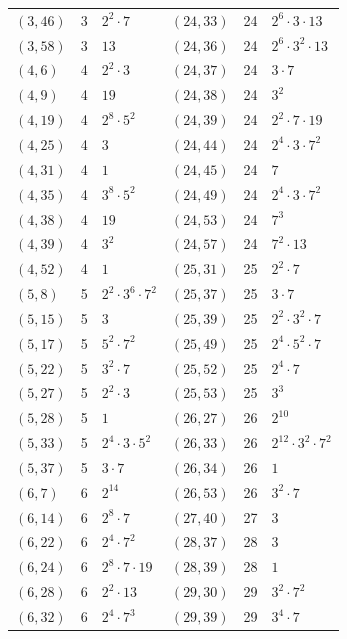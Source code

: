 \documentclass[11pt]{article}
\begin{document}
\begin{longtable}{@{}lrl@{\qquad}lrl@{}}
$(3,46)$ & 3 & $2^{2}\cdot 7$ & $(24,33)$ & 24 & $2^{6}\cdot 3\cdot 13$\\
$(3,58)$ & 3 & $13$ & $(24,36)$ & 24 & $2^{6}\cdot 3^{2}\cdot 13$\\
$(4,6)$ & 4 & $2^{2}\cdot 3$ & $(24,37)$ & 24 & $3\cdot 7$\\
$(4,9)$ & 4 & $19$ & $(24,38)$ & 24 & $3^{2}$\\
$(4,19)$ & 4 & $2^{8}\cdot 5^{2}$ & $(24,39)$ & 24 & $2^{2}\cdot 7\cdot 19$\\
$(4,25)$ & 4 & $3$ & $(24,44)$ & 24 & $2^{4}\cdot 3\cdot 7^{2}$\\
$(4,31)$ & 4 & $1$ & $(24,45)$ & 24 & $7$\\
$(4,35)$ & 4 & $3^{8}\cdot 5^{2}$ & $(24,49)$ & 24 & $2^{4}\cdot 3\cdot 7^{2}$\\
$(4,38)$ & 4 & $19$ & $(24,53)$ & 24 & $7^{3}$\\
$(4,39)$ & 4 & $3^{2}$ & $(24,57)$ & 24 & $7^{2}\cdot 13$\\
$(4,52)$ & 4 & $1$ & $(25,31)$ & 25 & $2^{2}\cdot 7$\\
$(5,8)$ & 5 & $2^{2}\cdot 3^{6}\cdot 7^{2}$ & $(25,37)$ & 25 & $3\cdot 7$\\
$(5,15)$ & 5 & $3$ & $(25,39)$ & 25 & $2^{2}\cdot 3^{2}\cdot 7$\\
$(5,17)$ & 5 & $5^{2}\cdot 7^{2}$ & $(25,49)$ & 25 & $2^{4}\cdot 5^{2}\cdot 7$\\
$(5,22)$ & 5 & $3^{2}\cdot 7$ & $(25,52)$ & 25 & $2^{4}\cdot 7$\\
$(5,27)$ & 5 & $2^{2}\cdot 3$ & $(25,53)$ & 25 & $3^{3}$\\
$(5,28)$ & 5 & $1$ & $(26,27)$ & 26 & $2^{10}$\\
$(5,33)$ & 5 & $2^{4}\cdot 3\cdot 5^{2}$ & $(26,33)$ & 26 & $2^{12}\cdot 3^{2}\cdot 7^{2}$\\
$(5,37)$ & 5 & $3\cdot 7$ & $(26,34)$ & 26 & $1$\\
$(6,7)$ & 6 & $2^{14}$ & $(26,53)$ & 26 & $3^{2}\cdot 7$\\
$(6,14)$ & 6 & $2^{8}\cdot 7$ & $(27,40)$ & 27 & $3$\\
$(6,22)$ & 6 & $2^{4}\cdot 7^{2}$ & $(28,37)$ & 28 & $3$\\
$(6,24)$ & 6 & $2^{8}\cdot 7\cdot 19$ & $(28,39)$ & 28 & $1$\\
$(6,28)$ & 6 & $2^{2}\cdot 13$ & $(29,30)$ & 29 & $3^{2}\cdot 7^{2}$\\
$(6,32)$ & 6 & $2^{4}\cdot 7^{3}$ & $(29,39)$ & 29 & $3^{4}\cdot 7$\\

\end{longtable}
\end{document}
